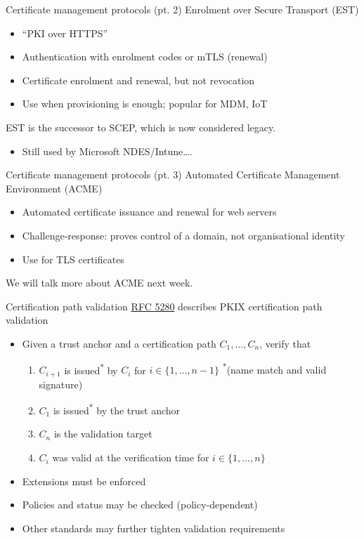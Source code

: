 \begin{frame}{Certificate management protocols (pt. 2)}
  Enrolment over Secure Transport (EST)
  \begin{itemize}[<+(1)->]
    \item \enquote{PKI over HTTPS}
    \item Authentication with enrolment codes or mTLS (renewal)
    \item Certificate enrolment and renewal, but not revocation
    \item Use when provisioning is enough; popular for MDM, IoT
  \end{itemize}

  \vspace*{1em}

  \pause
  EST is the successor to SCEP, which is now considered legacy.
  \begin{itemize}
    \item Still used by Microsoft NDES/Intune\dots.
  \end{itemize}
\end{frame}

\begin{frame}{Certificate management protocols (pt. 3)}
  Automated Certificate Management Environment (ACME)
  \begin{itemize}[<+(1)->]
    \item Automated certificate issuance and renewal for web servers
    \item Challenge-response: proves control of a domain, not organisational identity
    \item Use for TLS certificates
  \end{itemize}

  \pause
  We will talk more about ACME next week.
\end{frame}

\begin{frame}{Certification path validation}
  \href{https://datatracker.ietf.org/doc/html/rfc5280}{RFC 5280} describes PKIX certification path validation
  \begin{itemize}[<+(1)->]
    \item Given a trust anchor and a certification path $C_1, \dots, C_n$, verify that
    \begin{enumerate}[<+(1)->]
      \item $C_{i+1}$ is issued\textsuperscript{*} by $C_i$ for $i\in\{1, \dots, n-1\}$ \hfil {\scriptsize \textsuperscript{*}(name match and valid signature)}
      \item $C_1$ is issued\textsuperscript{*} by the trust anchor
      \item $C_n$ is the validation target
      \item $C_i$ was valid at the verification time for $i\in\{1, \dots, n\}$
    \end{enumerate}
    \item Extensions must be enforced
    \item Policies and status may be checked (policy-dependent)
    \item Other standards may further tighten validation requirements
  \end{itemize}
\end{frame}

